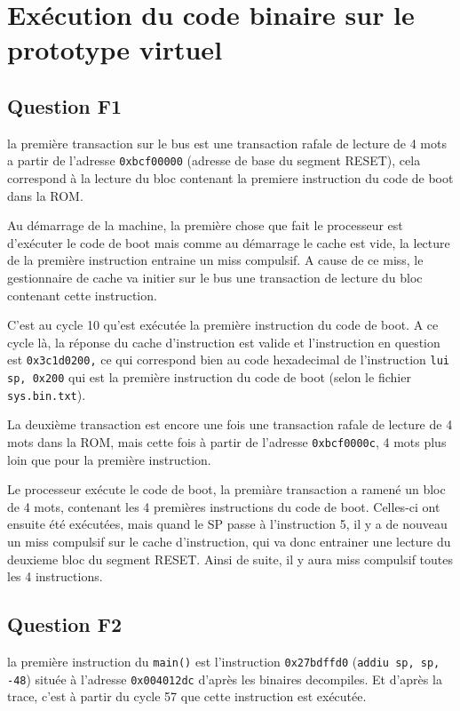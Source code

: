 \documentclass{article}
\begin{document}
\section{Exécution du code binaire sur le prototype virtuel}

\subsection{Question F1}

la première transaction sur le bus est une transaction rafale de lecture
de 4 mots a partir de l'adresse \texttt{0xbcf00000}
(adresse de base du segment RESET),
cela correspond à la lecture du bloc contenant la premiere instruction du
code de boot dans la ROM.

Au démarrage de la machine, la première chose que fait le processeur est
d'exécuter le code de boot mais comme au démarrage le cache est vide,
la lecture de la première instruction entraine un miss compulsif.
A cause de ce miss, le gestionnaire de cache va initier sur le bus
une transaction de lecture du bloc contenant cette instruction.

C'est au cycle 10 qu'est exécutée la première instruction du code de boot.
A ce cycle là, la réponse du cache d'instruction est valide et
l'instruction en question est \texttt{0x3c1d0200,} ce qui correspond bien au
code hexadecimal de l'instruction \texttt{lui sp, 0x200} qui est la première
instruction du code de boot (selon le fichier \texttt{sys.bin.txt}).

La deuxième transaction est encore une fois une transaction rafale de lecture
de 4 mots dans la ROM, mais cette fois à partir de l'adresse \texttt{0xbcf0000c},
4 mots plus loin que pour la première instruction.

Le processeur exécute le code de boot, la premiàre transaction a ramené un bloc
de 4 mots, contenant les 4 premières instructions du code de boot.
Celles-ci ont ensuite été exécutées, mais quand le SP passe à l'instruction 5,
il y a de nouveau un miss compulsif sur le cache d'instruction, qui va donc
entrainer une lecture du deuxieme bloc du segment RESET.
Ainsi de suite, il y aura miss compulsif toutes les 4 instructions.

\subsection{Question F2}

la première instruction du \texttt{main()} est l'instruction \texttt{0x27bdffd0}
(\texttt{addiu sp, sp, -48}) située à l'adresse \texttt{0x004012dc} d'après les binaires
decompiles.
Et d'après la trace, c'est à partir du cycle 57 que cette instruction
est exécutée.
\end{document}
